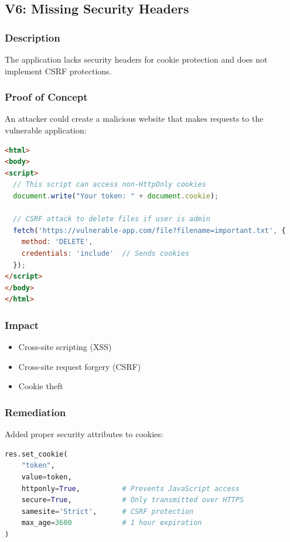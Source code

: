\documentclass[11pt,a4paper]{article}
\newenvironment{vulnerability}[3]{%
    \begin{tcolorbox}[
        colback=white,
        colframe=#1,
        fonttitle=\bfseries\color{white},
        coltitle=#1,
        title=#2: #3
    ]
}{%
    \end{tcolorbox}
}
\begin{document}
\subsection{V6: Missing Security Headers}

\begin{vulnerability}{mediumcolor}{Medium}{Missing Security Headers}
\subsubsection*{Description}
The application lacks security headers for cookie protection and does not implement CSRF protections.

\subsubsection*{Proof of Concept}
An attacker could create a malicious website that makes requests to the vulnerable application:

\begin{lstlisting}[language=html]
<html>
<body>
<script>
  // This script can access non-HttpOnly cookies
  document.write("Your token: " + document.cookie);
  
  // CSRF attack to delete files if user is admin
  fetch('https://vulnerable-app.com/file?filename=important.txt', {
    method: 'DELETE',
    credentials: 'include'  // Sends cookies
  });
</script>
</body>
</html>
\end{lstlisting}

\subsubsection*{Impact}
\begin{itemize}
    \item Cross-site scripting (XSS)
    \item Cross-site request forgery (CSRF)
    \item Cookie theft
\end{itemize}

\subsubsection*{Remediation}
Added proper security attributes to cookies:

\begin{lstlisting}[language=Python]
res.set_cookie(
    "token", 
    value=token, 
    httponly=True,          # Prevents JavaScript access
    secure=True,            # Only transmitted over HTTPS
    samesite='Strict',      # CSRF protection
    max_age=3600            # 1 hour expiration
)
\end{lstlisting}
\end{vulnerability}
\end{document}
